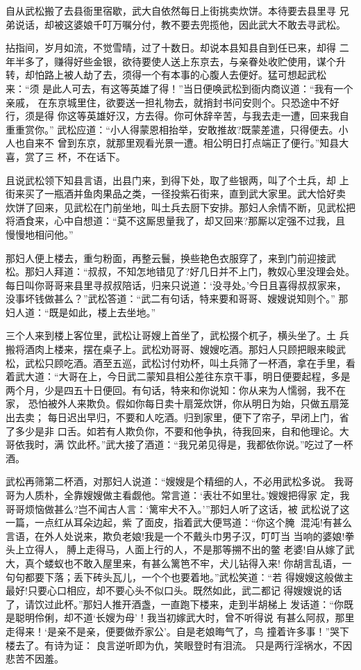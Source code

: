 自从武松搬了去县衙里宿歇，武大自依然每日上街挑卖炊饼。本待要去县里寻
兄弟说话，却被这婆娘千叮万嘱分付，教不要去兜揽他，因此武大不敢去寻武松。

拈指间，岁月如流，不觉雪晴，过了十数日。却说本县知县自到任已来，却得
二年半多了，赚得好些金银，欲待要使人送上东京去，与亲眷处收贮使用，谋个升
转，却怕路上被人劫了去，须得一个有本事的心腹人去便好。猛可想起武松来：“须
是此人可去，有这等英雄了得！”当日便唤武松到衙内商议道：“我有一个亲戚，
在东京城里住，欲要送一担礼物去，就捎封书问安则个。只恐途中不好行，须是得
你这等英雄好汉，方去得。你可休辞辛苦，与我去走一遭，回来我自重重赏你。”
武松应道：“小人得蒙恩相抬举，安敢推故?既蒙差遣，只得便去。小人也自来不
曾到东京，就那里观看光景一遭。相公明日打点端正了便行。”知县大喜，赏了三
杯，不在话下。

且说武松领下知县言语，出县门来，到得下处，取了些银两，叫了个土兵，却
上街来买了一瓶酒并鱼肉果品之类，一径投紫石街来，直到武大家里。武大恰好卖
炊饼了回来，见武松在门前坐地，叫土兵去厨下安排。那妇人余情不断，见武松把
将酒食来，心中自想道：“莫不这厮思量我了，却又回来?那厮以定强不过我，且
慢慢地相问他。”

那妇人便上楼去，重匀粉面，再整云鬟，换些艳色衣服穿了，来到门前迎接武
松。那妇人拜道：“叔叔，不知怎地错见了?好几日并不上门，教奴心里没理会处。
每日叫你哥哥来县里寻叔叔陪话，归来只说道：‘没寻处。’今日且喜得叔叔家来，
没事坏钱做甚么？”武松答道：“武二有句话，特来要和哥哥、嫂嫂说知则个。”
那妇人道：“既是如此，楼上去坐地。”

三个人来到楼上客位里，武松让哥嫂上首坐了，武松掇个杌子，横头坐了。土
兵搬将酒肉上楼来，摆在桌子上。武松劝哥哥、嫂嫂吃酒。那妇人只顾把眼来睃武
松，武松只顾吃酒。酒至五巡，武松讨付劝杯，叫土兵筛了一杯酒，拿在手里，看
着武大道：“大哥在上，今日武二蒙知县相公差往东京干事，明日便要起程，多是
两个月，少是四五十日便回。有句话，特来和你说知：你从来为人懦弱，我不在家，
恐怕被外人来欺负。假如你每日卖十扇笼炊饼，你从明日为始，只做五扇笼出去卖；
每日迟出早归，不要和人吃酒。归到家里，便下了帘子，早闭上门，省了多少是非
口舌。如若有人欺负你，不要和他争执，待我回来，自和他理论。大哥依我时，满
饮此杯。”武大接了酒道：“我兄弟见得是，我都依你说。”吃过了一杯酒。

武松再筛第二杯酒，对那妇人说道：“嫂嫂是个精细的人，不必用武松多说。
我哥哥为人质朴，全靠嫂嫂做主看觑他。常言道：‘表壮不如里壮。’嫂嫂把得家
定，我哥哥烦恼做甚么?岂不闻古人言：‘篱牢犬不入。’”那妇人听了这话，被
武松说了这一篇，一点红从耳朵边起，紫了面皮，指着武大便骂道：“你这个腌
混沌!有甚么言语，在外人处说来，欺负老娘!我是一个不戴头巾男子汉，叮叮当
当响的婆娘!拳头上立得人，膊上走得马，人面上行的人，不是那等搠不出的鳖
老婆!自从嫁了武大，真个蝼蚁也不敢入屋里来，有甚么篱笆不牢，犬儿钻得入来!
你胡言乱语，一句句都要下落；丢下砖头瓦儿，一个个也要着地。”武松笑道：“若
得嫂嫂这般做主最好!只要心口相应，却不要心头不似口头。既然如此，武二都记
得嫂嫂说的话了，请饮过此杯。”那妇人推开酒盏，一直跑下楼来，走到半胡梯上
发话道：“你既是聪明伶俐，却不道‘长嫂为母’！我当初嫁武大时，曾不听得说
有甚么阿叔，那里走得来！‘是亲不是亲，便要做乔家公’。自是老娘晦气了，鸟
撞着许多事！”哭下楼去了。有诗为证：
良言逆听即为仇，笑眼登时有泪流。
只是两行淫祸水，不因悲苦不因羞。

